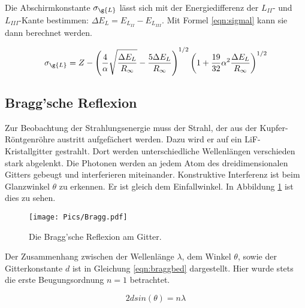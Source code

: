 Die Abschirmkonstante $\sigma_{\g{L}}$ lässt sich mit der Energiedifferenz der $L_{II}$-
und $L_{III}$-Kante bestimmen: $\Delta E_{L} = E_{L_{II}} - E_{L_{III}}$.
Mit Formel \eqref{eqn:sigmal} kann sie dann berechnet werden.

\begin{equation}
  \sigma_{\g{L}} = Z - \left(\frac{4}{\alpha} \sqrt{\frac{\Delta E_{L}}{R_{\infty}}} -
  \frac{5 \Delta E_{L}}{R_{\infty}} \right)^{1/2} \left(1 + \frac{19}{32} \alpha^2 \frac{\Delta E_{L}}{R_{\infty}} \right)^{1/2}
  \label{eqn:sigmal}
\end{equation}

\subsection{Bragg'sche Reflexion}

Zur Beobachtung der Strahlungsenergie muss der Strahl, der aus der Kupfer-Röntgenröhre
austritt aufgefächert werden. Dazu wird er auf ein LiF-Kristallgitter gestrahlt. Dort
werden unterschiedliche Wellenlängen verschieden stark abgelenkt. Die Photonen werden
an jedem Atom des dreidimensionalen Gitters gebeugt und interferieren miteinander.
Konstruktive Interferenz ist beim Glanzwinkel $\theta$ zu erkennen. Er ist gleich
dem Einfallwinkel. In Abbildung \ref{fig:bragg} ist dies zu sehen.

\begin{figure}
  \centering
  \texttt{[image: Pics/Bragg.pdf]}
  \caption{Die Bragg'sche Reflexion am Gitter. \cite{anleitung}}
  \label{fig:bragg}
\end{figure}

Der Zusammenhang zwischen der Wellenlänge $\lambda$, dem Winkel $\theta$, sowie der
Gitterkonstante $d$ ist in Gleichung \eqref{eqn:braggbed} dargestellt. Hier wurde
stets die erste Beugungsordnung $n=1$ betrachtet.

\begin{equation}
  2 d sin(\theta) = n \lambda
  \label{eqn:braggbed}
\end{equation}
